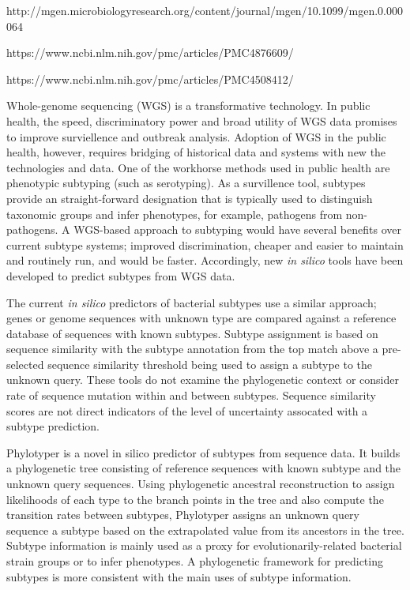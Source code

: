 \documentclass{bioinfo}
\begin{document}
http://mgen.microbiologyresearch.org/content/journal/mgen/10.1099/mgen.0.000064

https://www.ncbi.nlm.nih.gov/pmc/articles/PMC4876609/

https://www.ncbi.nlm.nih.gov/pmc/articles/PMC4508412/

Whole-genome sequencing (WGS) is a transformative technology.
In public health, the speed, discriminatory power and broad utility of WGS data promises to improve surviellence and outbreak analysis.
Adoption of WGS in the public health, however, requires bridging of historical data and systems with new the technologies and data.
One of the workhorse methods used in public health are phenotypic subtyping (such as serotyping).
As a survillence tool, subtypes provide an straight-forward designation that is typically used to distinguish taxonomic groups and infer phenotypes, for example, pathogens from non-pathogens.
A WGS-based approach to subtyping would have several benefits over current subtype systems; improved discrimination, cheaper and easier to maintain and routinely run, and would be faster.
Accordingly, new \textit{in silico} tools have been developed to predict subtypes from WGS data.

The current \textit{in silico} predictors of bacterial subtypes use a similar approach; genes or genome sequences with unknown type are compared against a reference database of sequences with known subtypes.
Subtype assignment is based on sequence similarity with the subtype annotation from the top match above a pre-selected sequence similarity threshold being used to assign a subtype to the unknown query.
These tools do not examine the phylogenetic context or consider rate of sequence mutation within and between subtypes.
Sequence similarity scores are not direct indicators of the level of uncertainty assocated with a subtype prediction.

Phylotyper is a novel in silico predictor of subtypes from sequence data. 
It builds a phylogenetic tree consisting of reference sequences with known subtype and the unknown query sequences.  
Using phylogenetic ancestral reconstruction to assign likelihoods of each type to the branch points in the tree and also compute the transition rates between subtypes, Phylotyper assigns an unknown query sequence a subtype based on the extrapolated value from its ancestors in the tree.
Subtype information is mainly used as a proxy for evolutionarily-related bacterial strain groups or to infer phenotypes.
A phylogenetic framework for predicting subtypes is more consistent with the main uses of subtype information.
\end{document}
